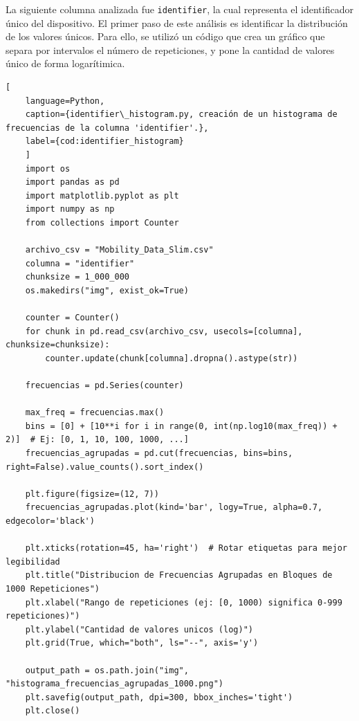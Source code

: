 \noindent La siguiente columna analizada fue \texttt{identifier}, la cual representa el identificador único del dispositivo. El primer paso de este análisis es identificar la distribución de los valores únicos. Para ello, se utilizó un código que crea un gráfico que separa por intervalos el número de repeticiones, y pone la cantidad de valores único de forma logarítimica. 

\begin{lstlisting}[
    language=Python,
    caption={identifier\_histogram.py, creación de un histograma de frecuencias de la columna 'identifier'.},
    label={cod:identifier_histogram}
    ]
    import os
    import pandas as pd
    import matplotlib.pyplot as plt
    import numpy as np
    from collections import Counter

    archivo_csv = "Mobility_Data_Slim.csv"
    columna = "identifier"  
    chunksize = 1_000_000  
    os.makedirs("img", exist_ok=True) 

    counter = Counter()
    for chunk in pd.read_csv(archivo_csv, usecols=[columna], chunksize=chunksize):
        counter.update(chunk[columna].dropna().astype(str))

    frecuencias = pd.Series(counter)

    max_freq = frecuencias.max()
    bins = [0] + [10**i for i in range(0, int(np.log10(max_freq)) + 2)]  # Ej: [0, 1, 10, 100, 1000, ...]
    frecuencias_agrupadas = pd.cut(frecuencias, bins=bins, right=False).value_counts().sort_index()

    plt.figure(figsize=(12, 7))
    frecuencias_agrupadas.plot(kind='bar', logy=True, alpha=0.7, edgecolor='black')

    plt.xticks(rotation=45, ha='right')  # Rotar etiquetas para mejor legibilidad
    plt.title("Distribucion de Frecuencias Agrupadas en Bloques de 1000 Repeticiones")
    plt.xlabel("Rango de repeticiones (ej: [0, 1000) significa 0-999 repeticiones)")
    plt.ylabel("Cantidad de valores unicos (log)")
    plt.grid(True, which="both", ls="--", axis='y')

    output_path = os.path.join("img", "histograma_frecuencias_agrupadas_1000.png")
    plt.savefig(output_path, dpi=300, bbox_inches='tight')
    plt.close()
\end{lstlisting}

